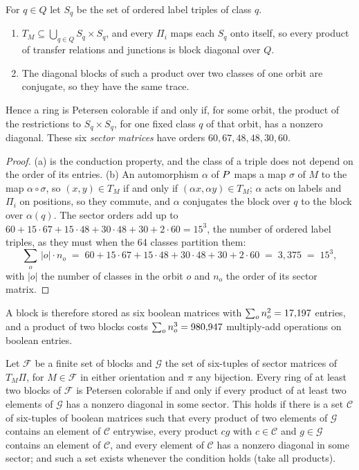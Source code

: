 \begin{proposition}[\claim{D}]\label{prop:sectors}
For $q \in Q$ let $S_q$ be the set of ordered label triples of class $q$.
\begin{enumerate}
\item[\textup{(a)}] $T_M \subseteq \bigcup_{q \in Q} S_q \times S_q$, and every $\Pi_i$ maps each $S_q$
onto itself, so every product of transfer relations and junctions is block diagonal over $Q$.
\item[\textup{(b)}] The diagonal blocks of such a product over two classes of one orbit are conjugate,
so they have the same trace.
\end{enumerate}
Hence a ring is Petersen colorable if and only if, for some orbit, the product of the restrictions
to $S_q \times S_q$, for one fixed class $q$ of that orbit, has a nonzero diagonal. These six
\emph{sector matrices} have orders $60, 67, 48, 48, 30, 60$.
\end{proposition}

\begin{proof}
(a) is the conduction property, and the class of a triple does not depend on the order of its
entries. (b) An automorphism $\alpha$ of $P$ maps a map $\sigma$ of $M$ to the map $\alpha \circ
\sigma$, so $(x, y) \in T_M$ if and only if $(\alpha x, \alpha y) \in T_M$; $\alpha$ acts on labels
and $\Pi_i$ on positions, so they commute, and $\alpha$ conjugates the block over $q$ to the block
over $\alpha(q)$. The sector orders add up to $60 + 15 \cdot 67 + 15 \cdot 48 + 30 \cdot 48 + 30 + 2
\cdot 60 = 15^3$, the number of ordered label triples, as they must when the 64 classes partition them:
\begin{equation}\label{eq:sectors}
\sum_{o}\,|o|\cdot n_o \;=\; 60 + 15\cdot 67 + 15\cdot 48 + 30\cdot 48 + 30 + 2\cdot 60 \;=\; 3{,}375 \;=\; 15^3 ,
\end{equation}
with $|o|$ the number of classes in the orbit $o$ and $n_o$ the order of its sector matrix.
\end{proof}

A block is therefore stored as six boolean matrices with $\sum_o n_o^2 = 17{,}197$ entries, and a
product of two blocks costs $\sum_o n_o^3 = 980{,}947$ multiply-add operations on boolean entries.

\begin{corollary}[\claim{D}]\label{cor:semigroup}
Let $\mathcal{F}$ be a finite set of blocks and $\mathcal{G}$ the set of six-tuples of sector
matrices of $T_M \Pi$, for $M \in \mathcal{F}$ in either orientation and $\pi$ any bijection. Every
ring of at least two blocks of $\mathcal{F}$ is Petersen colorable if and only if every product of at
least two elements of $\mathcal{G}$ has a nonzero diagonal in some sector. This holds if there is a
set $\mathcal{C}$ of six-tuples of boolean matrices such that every product of two elements of
$\mathcal{G}$ contains an element of $\mathcal{C}$ entrywise, every product $cg$ with $c \in
\mathcal{C}$ and $g \in \mathcal{G}$ contains an element of $\mathcal{C}$, and every element of
$\mathcal{C}$ has a nonzero diagonal in some sector; and such a set exists whenever the condition
holds (take all products).
\end{corollary}

